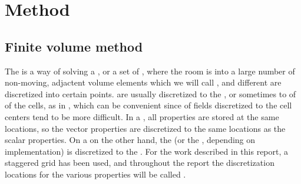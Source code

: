 \part{Method}

\chapter{Finite volume method}





\newabbrev{\textgammapath}{\mbox{$\gammapath$}}

The \FVM is a way of solving a \PDE, or a set of \PDEs, where the room is \discretized into a large number of non-moving, adjactent volume elements which we will call \cells, and different \properties are discretized into certain points.  are usually discretized to the , or sometimes to  of  of the cells, as in \citep{Losasso2004}, which can be convenient since \interpolation of fields discretized to the cell centers tend to be more difficult. In a , all properties are stored at the same locations, so the vector properties are discretized to the same locations as the scalar properties. On a  on the other hand, the \velocity (or the \momentum, depending on implementation) is discretized to the . For the work described in this report, a staggered grid has been used, and throughout the report the discretization locations for the various properties will be called .

